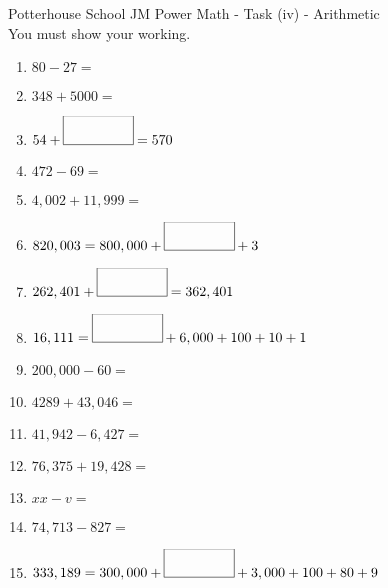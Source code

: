 \documentclass{article}
\date{}
\begin{document}
\fontsize{12}{13} \selectfont %

\begin{center}
Potterhouse School \hspace{3cm} JM Power Math - Task (iv)  - Arithmetic \\ 
\vspace{5pt}
You must show your working.
\end{center}

\begin{enumerate}

\item \(    80 - 27 = \)  \\ 

\item \( 348 + 5000 =   \) \\ 

\item \( 54 + \framebox(50,20){} = 570 \) \\ 

\item \(  472 - 69 =  \) \\ 

\item \(  4,002 + 11,999 =   \) \\ 

\item \( 820,003 = 800,000 + \framebox(50,20){} + 3  \) \\

\item \( 262, 401 + \framebox(50,20){} = 362,401 \) \\ 

\item \( 16,111 = \framebox(50,20){} + 6,000 + 100 + 10 + 1 \)  \\ 

\item \( 200,000 - 60 = \) \\ 

\item \( 4289 + 43,046 =   \) \\

\item \( 41,942 - 6,427 =   \) \\ 

\item \( 76,375 + 19,428 =  \) \\ 

\item \( xx - v =   \) \\

\item \( 74,713 - 827 =  \) \\

\item \( 333,189 = 300,000 + \framebox(50,20){} + 3,000 + 100 + 80 + 9  \) \\ 


\end{enumerate}
\end{document}
